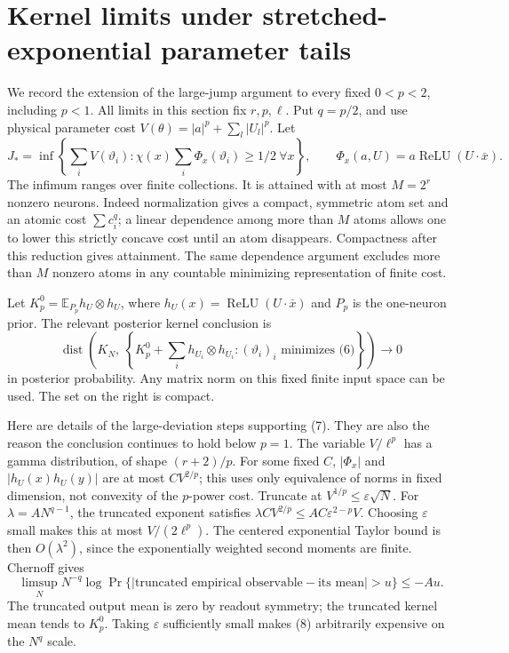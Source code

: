 \documentclass[11pt]{article}
\newcommand{\E}{\mathbb E}\newcommand{\R}{\mathbb R}
\newcommand{\relu}{\operatorname{ReLU}}
\begin{document}
\section{Kernel limits under stretched-exponential parameter tails}
We record the extension of the large-jump argument to every fixed
$0<p<2$, including $p<1$. All limits in this section fix $r,p,\ell$.
Put $q=p/2$, and use physical parameter cost
$V(\theta)=|a|^p+\sum_l|U_l|^p$.
Let
\[
 J_*=\inf\left\{\sum_i V(\vartheta_i):
 \chi(x)\sum_i\Phi_x(\vartheta_i)\ge1/2\ \forall x\right\},
 \qquad \Phi_x(a,U)=a\relu(U\cdot\bar x).
 \tag{6}
\]
The infimum ranges over finite collections. It is attained with at
most $M=2^r$ nonzero neurons. Indeed normalization gives a compact,
symmetric atom set and an atomic cost $\sum c_i^q$; a linear dependence
among more than $M$ atoms allows one to lower this strictly concave cost
until an atom disappears. Compactness after this reduction gives
attainment. The same dependence argument excludes more than $M$
nonzero atoms in any countable minimizing representation of finite cost.

Let $K_p^0=\E_{P_p}h_U\otimes h_U$, where
$h_U(x)=\relu(U\cdot\bar x)$ and $P_p$ is the one-neuron prior.
The relevant posterior kernel conclusion is
\[
 \operatorname{dist}\left(K_N,\
 \left\{K_p^0+\sum_i h_{U_i}\otimes h_{U_i}:
       (\vartheta_i)_i\text{ minimizes (6)}\right\}\right)
                              \longrightarrow0
 \tag{7}
\]
in posterior probability. Any matrix norm on this fixed finite input
space can be used. The set on the right is compact.

Here are details of the large-deviation steps supporting (7).
They are also the reason the conclusion continues to hold below $p=1$.
The variable $V/\ell^p$ has a gamma distribution, of shape $(r+2)/p$.
For some fixed $C$, $|\Phi_x|$ and $|h_U(x)h_U(y)|$ are at most
$CV^{2/p}$; this uses only equivalence of norms in fixed dimension,
not convexity of the $p$-power cost. Truncate at
$V^{1/p}\le\varepsilon\sqrt N$. For
$\lambda=A N^{q-1}$, the truncated exponent satisfies
$\lambda C V^{2/p}\le AC\varepsilon^{2-p}V$.
Choosing $\varepsilon$ small makes this at most $V/(2\ell^p)$.
The centered exponential Taylor bound is then $O(\lambda^2)$, since
the exponentially weighted second moments are finite. Chernoff gives
\[
 \limsup_N N^{-q}\log
 \Pr\{|\text{truncated empirical observable}
                  -\text{its mean}|>u\}\le-Au.
 \tag{8}
\]
The truncated output mean is zero by readout symmetry; the truncated
kernel mean tends to $K_p^0$. Taking $\varepsilon$ sufficiently small
makes (8) arbitrarily expensive on the $N^q$ scale.
\end{document}
